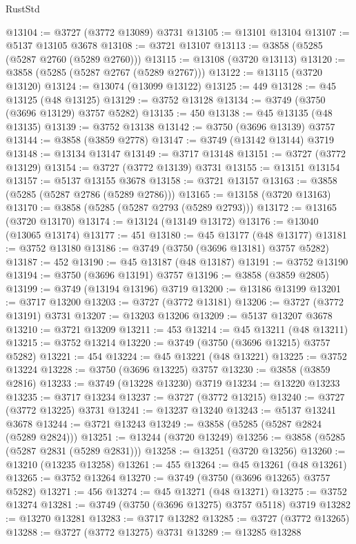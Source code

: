\begin{lexlean}{RustStd}
\begin{coremodule}
@13104 := @3727 (@3772 @13089) @3731
@13105 := @13101 @13104
@13107 := @5137 @13105 @3678
@13108 := @3721 @13107
@13113 := @3858 (@5285 (@5287 @2760 (@5289 @2760)))
@13115 := @13108 (@3720 @13113)
@13120 := @3858 (@5285 (@5287 @2767 (@5289 @2767)))
@13122 := @13115 (@3720 @13120)
@13124 := @13074 (@13099 @13122)
@13125 := 449
@13128 := @45 @13125 (@48 @13125)
@13129 := @3752 @13128
@13134 := @3749 (@3750 (@3696 @13129) @3757 @5282)
@13135 := 450
@13138 := @45 @13135 (@48 @13135)
@13139 := @3752 @13138
@13142 := @3750 (@3696 @13139) @3757
@13144 := @3858 (@3859 @2778)
@13147 := @3749 (@13142 @13144) @3719
@13148 := @13134 @13147
@13149 := @3717 @13148
@13151 := @3727 (@3772 @13129)
@13154 := @3727 (@3772 @13139) @3731
@13155 := @13151 @13154
@13157 := @5137 @13155 @3678
@13158 := @3721 @13157
@13163 := @3858 (@5285 (@5287 @2786 (@5289 @2786)))
@13165 := @13158 (@3720 @13163)
@13170 := @3858 (@5285 (@5287 @2793 (@5289 @2793)))
@13172 := @13165 (@3720 @13170)
@13174 := @13124 (@13149 @13172)
@13176 := @13040 (@13065 @13174)
@13177 := 451
@13180 := @45 @13177 (@48 @13177)
@13181 := @3752 @13180
@13186 := @3749 (@3750 (@3696 @13181) @3757 @5282)
@13187 := 452
@13190 := @45 @13187 (@48 @13187)
@13191 := @3752 @13190
@13194 := @3750 (@3696 @13191) @3757
@13196 := @3858 (@3859 @2805)
@13199 := @3749 (@13194 @13196) @3719
@13200 := @13186 @13199
@13201 := @3717 @13200
@13203 := @3727 (@3772 @13181)
@13206 := @3727 (@3772 @13191) @3731
@13207 := @13203 @13206
@13209 := @5137 @13207 @3678
@13210 := @3721 @13209
@13211 := 453
@13214 := @45 @13211 (@48 @13211)
@13215 := @3752 @13214
@13220 := @3749 (@3750 (@3696 @13215) @3757 @5282)
@13221 := 454
@13224 := @45 @13221 (@48 @13221)
@13225 := @3752 @13224
@13228 := @3750 (@3696 @13225) @3757
@13230 := @3858 (@3859 @2816)
@13233 := @3749 (@13228 @13230) @3719
@13234 := @13220 @13233
@13235 := @3717 @13234
@13237 := @3727 (@3772 @13215)
@13240 := @3727 (@3772 @13225) @3731
@13241 := @13237 @13240
@13243 := @5137 @13241 @3678
@13244 := @3721 @13243
@13249 := @3858 (@5285 (@5287 @2824 (@5289 @2824)))
@13251 := @13244 (@3720 @13249)
@13256 := @3858 (@5285 (@5287 @2831 (@5289 @2831)))
@13258 := @13251 (@3720 @13256)
@13260 := @13210 (@13235 @13258)
@13261 := 455
@13264 := @45 @13261 (@48 @13261)
@13265 := @3752 @13264
@13270 := @3749 (@3750 (@3696 @13265) @3757 @5282)
@13271 := 456
@13274 := @45 @13271 (@48 @13271)
@13275 := @3752 @13274
@13281 := @3749 (@3750 (@3696 @13275) @3757 @5118) @3719
@13282 := @13270 @13281
@13283 := @3717 @13282
@13285 := @3727 (@3772 @13265)
@13288 := @3727 (@3772 @13275) @3731
@13289 := @13285 @13288

\end{coremodule}
\end{lexlean}
